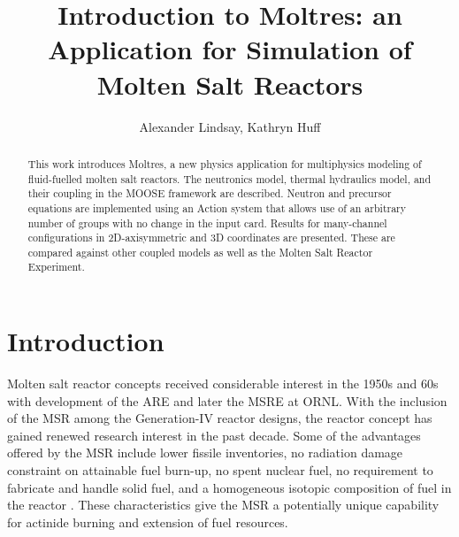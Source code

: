 \documentclass{article}
\title{Introduction to Moltres: an Application for Simulation of Molten Salt Reactors}
\author{Alexander Lindsay, Kathryn Huff}
\let\Oldsection\section
\renewcommand{\section}{\FloatBarrier\Oldsection}
\begin{document}
\maketitle

\begin{abstract}

This work introduces Moltres, a new physics application for multiphysics
modeling of fluid-fuelled molten salt reactors. The neutronics model, thermal
hydraulics model, and their coupling in the MOOSE framework are
described. Neutron and precursor equations are implemented using an Action
system that allows use of an arbitrary number of groups with no change in the
input card. Results for many-channel configurations in 2D-axisymmetric and 3D
coordinates are presented. These are compared against other coupled models as
well as the Molten Salt Reactor Experiment.

\end{abstract}

\section{Introduction}

Molten salt reactor concepts received considerable interest
in the 1950s and 60s with development of the \gls{ARE} and
later the \gls{MSRE} at \gls{ORNL}. With the inclusion of the \gls{MSR} among the
Generation-IV reactor designs, the reactor concept has gained renewed research
interest in the past decade. Some of the advantages offered by the \gls{MSR}
include lower fissile inventories, no radiation damage constraint on attainable
fuel burn-up, no spent nuclear fuel, no requirement to fabricate and handle
solid fuel, and a homogeneous isotopic composition of fuel in the
reactor \cite{noauthor_gen_2008}. These characteristics give the \gls{MSR} a
potentially unique capability for actinide burning and extension of fuel
resources.
\end{document}
